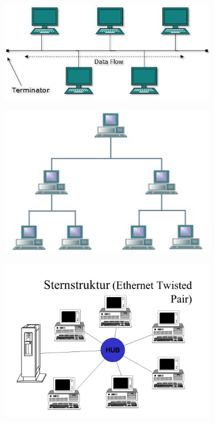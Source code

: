     \begin{figure}[h!]
        \centering
        \begin{subfigure}[b]{0.4\textwidth}
            \includegraphics[width=\linewidth]{bus_topology.jpg}
        \end{subfigure}
        \begin{subfigure}[b]{0.4\textwidth}
            \includegraphics[width=\linewidth]{tree_topology.jpg}
        \end{subfigure}
        \begin{subfigure}[b]{0.4\textwidth}
            \includegraphics[width=\linewidth]{stern_topology.jpg}

\end{subfigure}
\end{figure}
